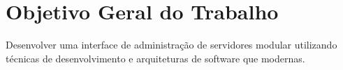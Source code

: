 \section{Objetivo Geral do Trabalho}

  Desenvolver uma interface de administração de servidores modular utilizando
  técnicas de desenvolvimento e arquiteturas de software que modernas.
